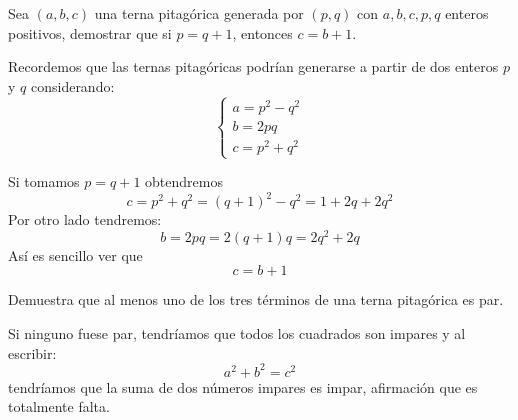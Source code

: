 \begin{problem}[10]
Sea $(a,b,c)$ una terna pitagórica generada por $(p,q)$ con $a,b,c,p,q$ enteros positivos, demostrar que si $p=q+1$, entonces $c=b+1$.

\solution
{}

Recordemos que las ternas pitagóricas podrían generarse a partir de dos enteros $p$ y $q$ considerando:
\[\left\{ \begin{array}{l} a=p^2-q^2 \\ b=2pq \\ c=p^2+q^2 \end{array} \right.\]

Si tomamos $p=q+1$ obtendremos
\[c=p^2+q^2=(q+1)^2-q^2=1+2q+2q^2\]
Por otro lado tendremos:
\[b=2pq=2(q+1)q=2q^2+2q\]
Así es sencillo ver que
\[c=b+1\]
\end{problem}

\begin{problem}[11]
Demuestra que al menos uno de los tres términos de una terna pitagórica es par.

\solution


Si ninguno fuese par, tendríamos que todos los cuadrados son impares y al escribir:
\[a^2+b^2=c^2\]
tendríamos que la suma de dos números impares es impar, afirmación que es totalmente falta.
\end{problem}

